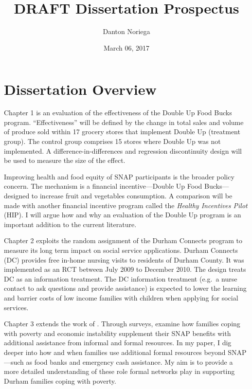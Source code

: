 \documentclass[12pt,letterpaperpaper,]{book}
\title{DRAFT Dissertation Prospectus}
\author{Danton Noriega}
\date{March 06, 2017}
\begin{document}
\maketitle

\setlength{\abovedisplayskip}{-5pt}
\setlength{\abovedisplayshortskip}{-5pt}
\mainmatter

{
\setcounter{tocdepth}{2}
\tableofcontents
}
\chapter*{Dissertation Overview}\label{dissertation-overview}

Chapter 1 is an evaluation of the effectiveness of the Double Up Food
Bucks program. ``Effectiveness'' will be defined by the change in total
sales and volume of produce sold within 17 grocery stores that implement
Double Up (treatment group). The control group comprises 15 stores where
Double Up was not implemented. A difference-in-differences and
regression discontinuity design will be used to measure the size of the
effect.

Improving health and food equity of SNAP participants is the broader
policy concern. The mechanism is a financial incentive---Double Up Food
Bucks---designed to increase fruit and vegetables consumption. A
comparison will be made with another financial incentive program called
the \emph{Healthy Incentives Pilot} (HIP). I will argue how and why an
evaluation of the Double Up program is an important addition to the
current literature.

Chapter 2 exploits the random assignment of the Durham Connects program
to measure its long term impact on social service applications. Durham
Connects (DC) provides free in-home nursing visits to residents of
Durham County. It was implemented as an RCT between July 2009 to
December 2010. The design treats DC as an information treatment. The DC
information treatment (e.g.~a nurse contact to ask questions and provide
assistance) is expected to lower the learning and barrier costs of low
income families with children when applying for social services.

Chapter 3 extends the work of \citet{schenck-fontaine_use_2016}. Through
surveys, \citet{schenck-fontaine_use_2016} examine how families coping
with poverty and economic instability supplement their SNAP benefits
with additional assistance from informal and formal resources. In my
paper, I dig deeper into how and when families use additional formal
resources beyond SNAP---such as food banks and emergency cash
assistance. My aim is to provide a more detailed understanding of these
role formal networks play in supporting Durham families coping with
poverty.
\end{document}
